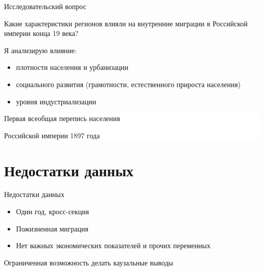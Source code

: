 \documentclass[aspectratio=169]{beamer}
\begin{document}
\begin{frame}{Исследовательский вопрос}

Какие характеристики регионов влияли на внутренние миграции в Российской империи конца 19 века?
\par
Я анализирую влияние:
\begin{itemize}
	\item плотности населения и урбанизации
	\item социального развития (грамотности, естественного прироста населения)
	\item уровня индустриализации
\end{itemize}

\end{frame}

{
\begin{frame}[b]
\hfill \colorbox{white}{\parbox{0.64\textwidth}{Первая всеобщая перепись населения \par Российской империи 1897 года \citep{census_1897}}}
\bigskip
\end{frame}
}

\section{Недостатки данных}
\begin{frame}{Недостатки данных}

\begin{itemize}
	\item Один год, кросс-секция
	\item Пожизненная миграция
	\item Нет важных экономических показателей и прочих переменных
\end{itemize}
\par
Ограниченная возможность делать каузальные выводы

\end{frame}
\end{document}
